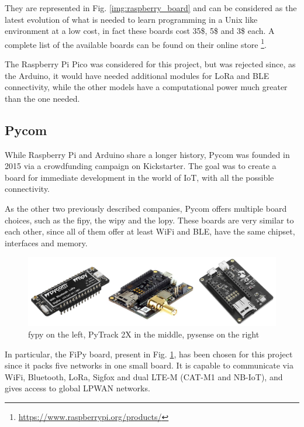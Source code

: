 		They are represented in Fig. \ref{img:raspberry_board} and can be considered as the latest evolution of what is needed to learn programming in a Unix like environment at a low cost, in fact these boards cost 35\$, 5\$ and 3\$ each.
		A complete list of the available boards can be found on their online store \footnote{\url{https://www.raspberrypi.org/products/}}.
		
		The Raspberry Pi Pico was considered for this project, but was rejected since, as the Arduino, it would have needed additional modules for LoRa and BLE connectivity, while the other models have a computational power much greater than the one needed.
			
	\subsection{Pycom}
		
		While Raspberry Pi and Arduino share a longer history, Pycom was founded in 2015 via a crowdfunding campaign on Kickstarter.
		The goal was to create a board for immediate development in the world of IoT, with all the possible connectivity.
			
		As the other two previously described companies, Pycom offers multiple board choices, such as the fipy, the wipy and the lopy.
		These boards are very similar to each other, since all of them offer at least WiFi and BLE, have the same chipset, interfaces and memory.

		\begin{figure}[H]
			\centering
			\includegraphics[width=\textwidth]{resources/img/chap3/pycom_board}
			\caption{fypy on the left, PyTrack 2X in the middle, pysense on the right}
			\label{img:pycom_board}
		\end{figure}	
		
		In particular, the FiPy board, present in Fig. \ref{img:pycom_board}, has been chosen for this project since it packs five networks in one small board.
		It is capable to communicate via WiFi, Bluetooth, LoRa, Sigfox and dual LTE-M (CAT-M1 and NB-IoT), and gives access to global LPWAN networks.
		
